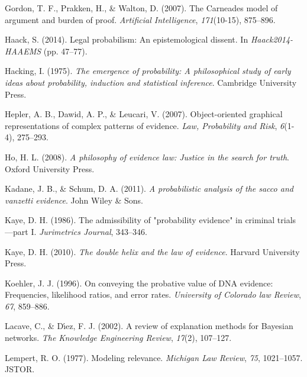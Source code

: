 \documentclass[11pt,dvipsnames,enabledeprecatedfontcommands]{scrartcl}
\begin{document}
\leavevmode\hypertarget{ref-gordon2007}{}%
Gordon, T. F., Prakken, H., \& Walton, D. (2007). The Carneades model of
argument and burden of proof. \emph{Artificial Intelligence},
\emph{171}(10-15), 875--896.

\leavevmode\hypertarget{ref-haack2011legal}{}%
Haack, S. (2014). Legal probabilism: An epistemological dissent. In
\emph{Haack2014-HAAEMS} (pp. 47--77).

\leavevmode\hypertarget{ref-Hacking1984}{}%
Hacking, I. (1975). \emph{The emergence of probability: A philosophical
study of early ideas about probability, induction and statistical
inference}. Cambridge University Press.

\leavevmode\hypertarget{ref-hepler2007ObjectorientedGraphicalRepresentations}{}%
Hepler, A. B., Dawid, A. P., \& Leucari, V. (2007). Object-oriented
graphical representations of complex patterns of evidence. \emph{Law,
Probability and Risk}, \emph{6}(1-4), 275--293.

\leavevmode\hypertarget{ref-ho2008philosophy}{}%
Ho, H. L. (2008). \emph{A philosophy of evidence law: Justice in the
search for truth}. Oxford University Press.

\leavevmode\hypertarget{ref-kadane2011probabilistic}{}%
Kadane, J. B., \& Schum, D. A. (2011). \emph{A probabilistic analysis of
the sacco and vanzetti evidence}. John Wiley \& Sons.

\leavevmode\hypertarget{ref-kaye1986admissibility}{}%
Kaye, D. H. (1986). The admissibility of "probability evidence" in
criminal trials---part I. \emph{Jurimetrics Journal}, 343--346.

\leavevmode\hypertarget{ref-Kaye2010The-Double-Heli}{}%
Kaye, D. H. (2010). \emph{The double helix and the law of evidence}.
Harvard University Press.

\leavevmode\hypertarget{ref-Koehler1996On-Conveying-th}{}%
Koehler, J. J. (1996). On conveying the probative value of DNA evidence:
Frequencies, likelihood ratios, and error rates. \emph{University of
Colorado law Review}, \emph{67}, 859--886.

\leavevmode\hypertarget{ref-lacave2002ReviewExplanationMethodsa}{}%
Lacave, C., \& Dı́ez, F. J. (2002). A review of explanation methods for
Bayesian networks. \emph{The Knowledge Engineering Review},
\emph{17}(2), 107--127.

\leavevmode\hypertarget{ref-lempert1977modeling}{}%
Lempert, R. O. (1977). Modeling relevance. \emph{Michigan Law Review},
\emph{75}, 1021--1057. JSTOR.
\end{document}

